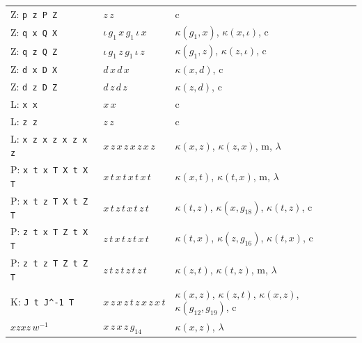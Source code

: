 \begin{center}
\begin{tabular}{@{}p{}p{}p{}@{}}
Z: \texttt{p z P Z} & $z\,z$ & c \\
Z: \texttt{q x Q X} & $\iota\,g_{1}\,x\,g_{1}\,\iota\,x$ & $\kappa(g_{1},x)$, $\kappa(x,\iota)$, c \\
Z: \texttt{q z Q Z} & $\iota\,g_{1}\,z\,g_{1}\,\iota\,z$ & $\kappa(g_{1},z)$, $\kappa(z,\iota)$, c \\
Z: \texttt{d x D X} & $d\,x\,d\,x$ & $\kappa(x,d)$, c \\
Z: \texttt{d z D Z} & $d\,z\,d\,z$ & $\kappa(z,d)$, c \\
L: \texttt{x x} & $x\,x$ & c \\
L: \texttt{z z} & $z\,z$ & c \\
L: \texttt{x z x z x z x z} & $x\,z\,x\,z\,x\,z\,x\,z$ & $\kappa(x,z)$, $\kappa(z,x)$, m, $\lambda$ \\
P: \texttt{x t x T X t X T} & $x\,t\,x\,t\,x\,t\,x\,t$ & $\kappa(x,t)$, $\kappa(t,x)$, m, $\lambda$ \\
P: \texttt{x t z T X t Z T} & $x\,t\,z\,t\,x\,t\,z\,t$ & $\kappa(t,z)$, $\kappa(x,g_{18})$, $\kappa(t,z)$, c \\
P: \texttt{z t x T Z t X T} & $z\,t\,x\,t\,z\,t\,x\,t$ & $\kappa(t,x)$, $\kappa(z,g_{16})$, $\kappa(t,x)$, c \\
P: \texttt{z t z T Z t Z T} & $z\,t\,z\,t\,z\,t\,z\,t$ & $\kappa(z,t)$, $\kappa(t,z)$, m, $\lambda$ \\
K: \texttt{J t J\textasciicircum{}-1 T} & $x\,z\,x\,z\,t\,z\,x\,z\,x\,t$ & $\kappa(x,z)$, $\kappa(z,t)$, $\kappa(x,z)$, $\kappa(g_{12},g_{19})$, c \\
$xzxz\,w^{-1}$ & $x\,z\,x\,z\,g_{14}$ & $\kappa(x,z)$, $\lambda$ \\
\bottomrule
\end{tabular}
\captionsetup{hypcap=false}%
\label{cert:tab-deriv}
\end{center}
